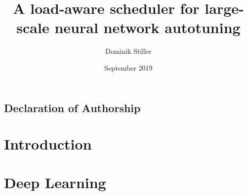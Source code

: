 \title{A load-aware scheduler for large-scale neural network autotuning}
\author{Dominik Stiller}
\date{September 2019}



\makeglossaries




	\pagestyle{empty}
	\makeatletter
	\begin{titlepage}
		
	\end{titlepage}
	
	\section*{Declaration of Authorship}
	
	\makeatother

	\begin{abstract}
		
	\end{abstract}

	\setlength{\cftbeforetoctitleskip}{0em}
	\begin{spacing}{1.15}
	   \tableofcontents
	\end{spacing}
	\clearpage
	\thispagestyle{empty}
	
	\pagestyle{plain}
	
	\printacronyms
	\clearpage
	
	\listoffigures
	\clearpage
	\listoftables
	\renewcommand\listoflistingscaption{List of Source Codes}
	\listoflistings
	\clearpage
	
	
	\pagestyle{headings}
	
	\obeylines
	\chapter{Introduction}
	
	\chapter{Deep Learning}
	
